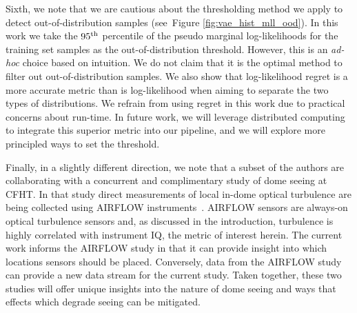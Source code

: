 Sixth, we note that we are cautious about the thresholding method we apply to detect out-of-distribution samples (see~Figure \ref{fig:vae_hist_mll_ood}). In this work we take the $95^{\rm th}$ percentile of the pseudo marginal log-likelihoods for the training set samples as the out-of-distribution threshold. However, this is an {\it ad-hoc} choice based on intuition.  We do not claim that it is the optimal method to filter out out-of-distribution samples. We also show that log-likelihood regret is a more accurate metric than is log-likelihood when aiming to separate the two types of distributions.  We refrain from using regret in this work due to practical concerns about run-time. In future work, we will leverage distributed computing to  integrate this superior metric into our pipeline, and we will explore more principled ways to set the threshold.


Finally, in a slightly different direction, we note that a subset of the authors are collaborating with a concurrent and complimentary study of dome seeing at CFHT. In that study direct measurements of local in-dome optical turbulence are being collected using AIRFLOW instruments~\cite{lai2019}. AIRFLOW sensors are always-on optical turbulence sensors and, as discussed in the introduction, turbulence is  highly correlated with instrument IQ, the metric of interest herein. The current work informs the AIRFLOW study in that it can provide insight into which locations sensors should be placed.  Conversely,  data from the AIRFLOW study can provide a new data stream for the current study.   Taken together, these two studies will offer unique insights into the nature of dome seeing and ways that effects which degrade seeing can be mitigated.



